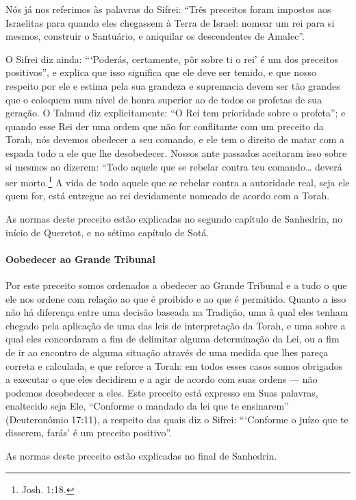 Nós já nos referimos às palavras do Sifrei: ``Três preceitos foram
impostos aos Israelitas para quando eles chegassem à Terra de Israel:
nomear um rei para si mesmos, construir o Santuário, e aniquilar os
descendentes de Amalec''.

O Sifrei diz ainda: ```Poderás, certamente, pôr sobre ti o rei' é um dos
preceitos positivos'', e explica que isso significa que ele deve ser
temido, e que nosso respeito por ele e estima pela sua grandeza e
supremacia devem ser tão grandes que o coloquem num nível de honra superior ao de todos
os profetas de sua geração. O Talmud diz explicitamente: ``O Rei tem
prioridade sobre o profeta''; e quando esse Rei der uma ordem que não for
conflitante com um preceito da Torah, nós devemos obedecer a seu comando, e ele tem
o direito de matar com a espada todo a ele que lhe desobedecer. Nossos
ante passados aceitaram isso sobre si mesmos ao dizerem: ``Todo aquele que se
rebelar contra teu comando\ldots{} deverá ser morto.\footnote{Josh. 1:18.} A vida de
todo aquele que se rebelar contra a autoridade real, seja ele quem for, está entregue ao rei devidamente nomeado de acordo com a Torah.

As normas deste preceito estão explicadas no segundo capítulo de
Sanhedrin, no início de Queretot, e no sétimo capítulo de Sotá.

\paragraph{Oobedecer ao Grande Tribunal}

Por este preceito somos ordenados a obedecer ao Grande Tribunal e a tudo
o que ele nos ordene com relação ao que é proibido e ao que é permitido. Quanto a isso não há diferença entre uma decisão baseada na
Tradição, uma à qual eles tenham chegado pela aplicação de uma das leis
de interpretação da Torah, e uma sobre a qual eles concordaram a fim de
delimitar alguma determinação da Lei, ou a fim de ir ao encontro de
alguma situação através de uma medida que lhes pareça correta e
calculada, e que reforce a Torah: em todos esses casos somos obrigados a
executar o que eles decidirem e a agir de acordo com suas ordens --- não
podemos desobedecer a eles. Este preceito está expresso em Suas
palavras, enaltecido seja Ele, ``Conforme o mandado da lei que te
ensinarem'' (Deuteronômio 17:11), a respeito das quais diz o Sifrei:
```Conforme o juízo que te disserem, farás' é um preceito positivo''.

As normas deste preceito estão explicadas no final de Sanhedrin.

